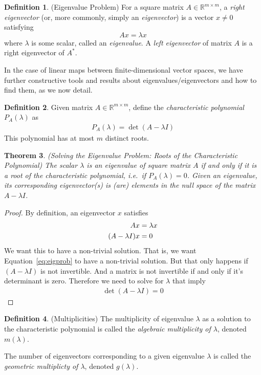 \documentclass[12pt]{book}
\numberwithin{equation}{section} %
\theoremstyle{plain}
\newtheorem{thm}{Theorem}[section]
\theoremstyle{definition}
\newtheorem{defn}[thm]{Definition}
\theoremstyle{remark}
\newcommand{\Rmm}{\mathbb{R}^{m\times m}}
\begin{document}
\begin{defn}{(Eigenvalue Problem)}
For a square matrix $A \in \Rmm$, a \emph{right eigenvector}
(or, more commonly, simply an \emph{eigenvector}) is a vector $x\neq 0$
satisfying
\begin{equation}
  Ax = \lambda x
\end{equation}
where $\lambda$ is some scalar, called an \emph{eigenvalue}.  A
\emph{left eigenvector} of matrix $A$ is a right eigenvector of $A^*$.
\end{defn}

In the case of linear maps between finite-dimensional vector spaces, we
have further constructive tools and results about
eigenvalues/eigenvectors and how to find them, as we now detail.

\begin{defn}
Given matrix $A\in \Rmm$, define the
\emph{characteristic polynomial} $P_A(\lambda)$ as
\begin{align}
  \label{chareqn}
  P_A(\lambda) = \det(A-\lambda I)
\end{align}
This polynomial has at most $m$ distinct roots.
\end{defn}


\begin{thm}
\emph{(Solving the Eigenvalue Problem: Roots of the Characteristic
Polynomial)}
The scalar $\lambda$ is an eigenvalue of square matrix $A$ if and only
if it is a root of the characteristic polynomial, i.e.\ if
$P_A(\lambda)=0$.  Given an eigenvalue, its corresponding eigenvector(s)
is (are) elements in the null space of the matrix $A-\lambda I$.
\end{thm}
\begin{proof}
By definition, an eigenvector $x$ satisfies
\begin{align}
  A x &= \lambda x\notag\\
  (A- \lambda I)x &= 0
  \label{eq:eigprob}
\end{align}
We want this to have a non-trivial solution. That is, we want
Equation~\ref{eq:eigprob} to have a non-trivial solution. But that only
happens if $(A-\lambda I)$ is not invertible. And a matrix is not
invertible if and only if it's determinant is zero. Therefore we need to
solve for $\lambda$ that imply
\begin{align*}
  \det(A-\lambda I)=0
\end{align*}
\end{proof}


\begin{defn}{(Multiplicities)}
The multiplicity of eigenvalue $\lambda$ as a solution to the
characteristic polynomial is called the \emph{algebraic multiplicity of
$\lambda$}, denoted $m(\lambda)$.

The number of eigenvectors corresponding to a given eigenvalue $\lambda$
is called the \emph{geometric multiplicty of $\lambda$}, denoted
$g(\lambda)$.
\end{defn}
\end{document}
